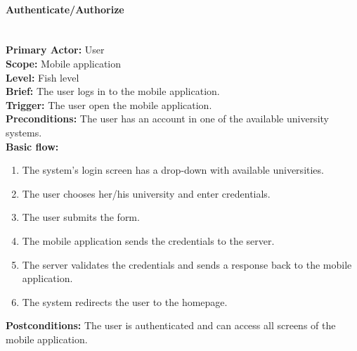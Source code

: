\paragraph{\large{Authenticate/Authorize}}\mbox{}\\[2pt]
\textbf{Primary Actor:} User\\
\textbf{Scope:} Mobile application\\
\textbf{Level:} Fish level\\
\textbf{Brief:} The user logs in to the mobile application.\\
\textbf{Trigger:} The user open the mobile application.\\
\textbf{Preconditions:}
The user has an account in one of the available university systems.\\
\textbf{Basic flow:}
\begin{enumerate}
    \item The system's login screen has a drop-down with available universities.
    \item The user chooses her/his university and enter credentials.
    \item The user submits the form.
    \item The mobile application sends the credentials to the server.
    \item The server validates the credentials and sends a response back to the mobile application.
    \item The system redirects the user to the homepage.
\end{enumerate}
\textbf{Postconditions:}
The user is authenticated and can access all screens of the mobile application.


